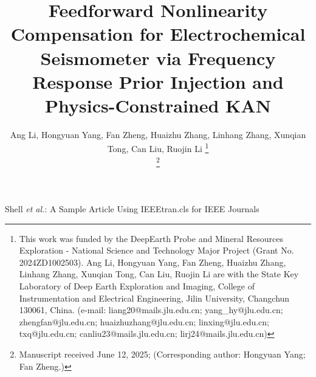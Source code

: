 \documentclass[journal]{IEEEtran}
\begin{document}
\title{ Feedforward Nonlinearity Compensation for Electrochemical Seismometer via Frequency Response Prior Injection and Physics-Constrained KAN}

\author{Ang Li, Hongyuan Yang, Fan Zheng, Huaizhu Zhang, Linhang Zhang, Xunqian Tong, Can Liu, Ruojin Li
\thanks{This work was funded by the DeepEarth Probe and Mineral Resources Exploration - National Science and Technology Major Project (Grant No. 2024ZD1002503).
		Ang Li, Hongyuan Yang, Fan Zheng, Huaizhu Zhang, Linhang Zhang, Xunqian Tong, Can Liu, Ruojin Li are with the State Key Laboratory of Deep Earth Exploration and Imaging, College of Instrumentation and Electrical Engineering, Jilin University, Changchun 130061, China. (e-mail: liang20@mails.jlu.edu.cn; yang\_hy@jlu.edu.cn; zhengfan@jlu.edu.cn; huaizhuzhang@jlu.edu.cn; linxing@jlu.edu.cn; txq@jlu.edu.cn; canliu23@mails.jlu.edu.cn; lirj24@mails.jlu.edu.cn)}%

\thanks{Manuscript received June 12, 2025; (Corresponding author: Hongyuan Yang; Fan Zheng.)}}

%
{Shell \MakeLowercase{\textit{et al.}}: A Sample Article Using IEEEtran.cls for IEEE Journals}


\maketitle
\end{document}
